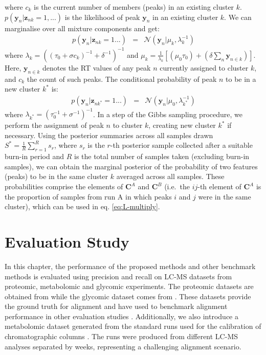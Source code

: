 where $c_{k}$ is the current number of members (peaks) in an existing cluster $k$. $p(\mathbf{y}_{n}|\boldsymbol{z}_{nk}=1,...)$ is the likelihood of peak $\mathbf{y}_{n}$ in an existing cluster $k$. We can marginalise over all mixture components and get: 
\begin{eqnarray}
p(\mathbf{y}_{n}|\boldsymbol{z}_{nk}=1...) & = & \mathcal{N}(\mathbf{y}_{n}|\mu_{k},\lambda_{k}^{-1})\label{eq:15}
\end{eqnarray}
where $\lambda_{k}=((\tau_{0}+\sigma c_{k})^{-1}+\delta^{-1})^{-1}$ and $\mu_{k}=\frac{1}{\lambda_{k}}\left[(\mu_{0}\tau_{0})+(\delta\sum_{n}\mathbf{y}_{n\in k})\right]$. Here, $\mathbf{y}_{n\in k}$ denotes the RT values of any peak $n$ currently assigned to cluster $k$, and $c_{k}$ the count of such peaks. The conditional probability of peak $n$ to be in a new cluster
$k^{*}$ is:
\begin{eqnarray}
p(\mathbf{y}_{n}|\boldsymbol{z}_{nk^{*}}=1...) & = & \mathcal{N}(\mathbf{y}_{n}|\mu_{0},\lambda_{k^{*}}^{-1})\label{eq:15-1}
\end{eqnarray}
where $\lambda_{k^{*}}=(\tau_{0}^{-1}+\sigma^{-1})^{-1}$.
In a step of the Gibbs sampling procedure, we perform the assignment of peak $n$ to cluster $k$, creating new cluster $k^{*}$ if necessary. Using the posterior summaries across all samples drawn $S^{*}=\frac{1}{R}\sum_{r=1}^{R}s{}_{r}$, where $s{}_{r}$ is the $r$-th posterior sample collected after a suitable burn-in period and $R$ is the total number of samples taken (excluding burn-in samples), we can obtain the marginal posterior of the probability of two features (peaks) to be in the same cluster $k$ averaged across all samples. These probabilities comprise the elements of $\mathbf{C}^A$ and $\mathbf{C}^B$ (i.e.\ the $ij$-th element of $\mathbf{C}^A$ is the proportion of samples from run A in which peaks $i$ and $j$ were in the same cluster), which can be used in eq. \ref{eq:L-multiply}.

\section{Evaluation Study\label{sub:evaluation-study}}

In this chapter, the performance of the proposed methods and other benchmark methods is evaluated using precision and recall on LC-MS datasets from proteomic, metabolomic and glycomic experiments. The proteomic datasets are obtained from \cite{Lange2008} while the glycomic dataset comes from \cite{Tsai2013a}. These datasets provide the ground truth for alignment and have used to benchmark alignment performance in other evaluation studies \cite{Lange2008, Pluskal2010, Ballardini2011, Voss2011a, Tsai2013a}. Additionally, we also introduce a metabolomic dataset generated from the standard runs used for the calibration of chromatographic columns \cite{Creek2011}. The runs were produced from different LC-MS analyses separated by weeks, representing a challenging alignment scenario. 

